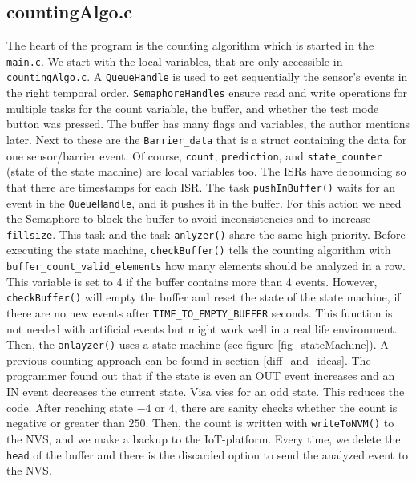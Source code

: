 \subsection{countingAlgo.c}
The heart of the program is the counting algorithm which is started in the \verb!main.c!.
We start with the local variables, that are only accessible in \verb!countingAlgo.c!. A \verb!QueueHandle! is
used to get sequentially the sensor's events in the right temporal order.
\verb!SemaphoreHandles! ensure read and write operations for multiple tasks for the count variable,
the buffer, and whether the test mode button was pressed. The buffer has many flags and variables, the author mentions
later. Next to these are the \verb!Barrier_data!
that is a struct containing the data for one sensor/barrier event. Of course, \verb!count!,
\verb!prediction!, and \verb!state_counter! (state of the state machine) are local variables too.
The ISRs have debouncing so that there are timestamps for each ISR.
The task \verb!pushInBuffer()! waits for an event in the \verb!QueueHandle!, and it pushes it in the buffer.
For this action we need the Semaphore to block the buffer to avoid inconsistencies and
to increase \verb!fillsize!.
This task and the task \verb!anlyzer()! share the same high priority.
Before executing the state machine, \verb!checkBuffer()! tells the counting algorithm with
\verb!buffer_count_valid_elements! how many elements should be analyzed in a row. This variable
is set to 4 if the buffer contains more than 4 events. However, \verb!checkBuffer()! will empty the buffer and
reset the state of the state machine, if there
are no new events after \verb!TIME_TO_EMPTY_BUFFER! seconds. This function is not needed with artificial events
but might work well in a real life environment. Then,
the \verb!anlayzer()! uses a state
machine (see figure \ref{fig_stateMachine}). A previous counting approach can be found in section \ref{diff_and_ideas}.
The programmer found out that if the state is even an OUT event increases and an IN event decreases the current
state. Visa vies for an odd state. This reduces the code. After reaching state $-4$ or $4$, there are sanity checks
whether the count is negative or greater than $250$. Then, the count is written with \verb!writeToNVM()! to the
NVS, and we make a backup to the IoT-platform. Every time, we delete the \verb!head! of the buffer and there is
the discarded option to send the analyzed event to the NVS.\\

